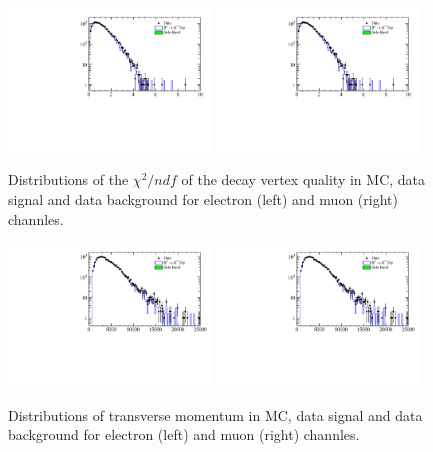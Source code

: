 \begin{figure}[h!]
\centering
\includegraphics[width=0.48\textwidth]{RKst/figs/MC_data_comp/EE/drawVariables_B0_ENDVERTEX_CHI2_B0_ENDVERTEX_NDOF.pdf}
\includegraphics[width=0.48\textwidth]{RKst/figs/MC_data_comp/MM/drawVariables_B0_ENDVERTEX_CHI2_B0_ENDVERTEX_NDOF.pdf}
\caption{ Distributions of the $\chi^2/ndf$ of the \Bz decay vertex quality in MC, data signal and data background for electron (left) and muon (right) channles.   }
\end{figure}



\begin{figure}[h!]
\centering
\includegraphics[width=0.48\textwidth]{RKst/figs/MC_data_comp/EE/drawVariables_Kst_PT.pdf}
\includegraphics[width=0.48\textwidth]{RKst/figs/MC_data_comp/MM/drawVariables_Kst_PT.pdf}
\caption{ Distributions of \Kstar transverse momentum in MC, data signal and data background for electron (left) and muon (right) channles.   }
\end{figure}

